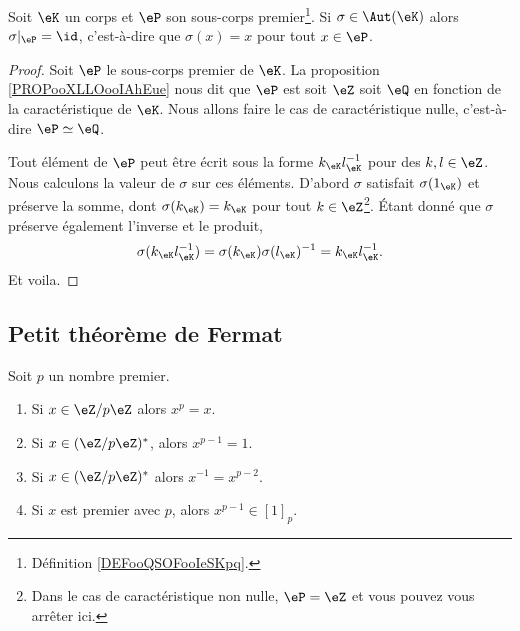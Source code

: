 \begin{proposition}     \label{PropqPPrgJ}
	Soit \( \eK\) un corps et \( \eP\) son sous-corps premier\footnote{Définition \ref{DEFooQSOFooIeSKpq}.}. Si \( \sigma\in\Aut(\eK)\) alors \( \sigma|_{\eP}=\id\), c'est-à-dire que \( \sigma(x)=x\) pour tout \( x\in \eP\).
\end{proposition}

\begin{proof}
	Soit \( \eP\) le sous-corps premier de \( \eK\). La proposition \ref{PROPooXLLOooIAhEue} nous dit que \( \eP\) est soit \( \eZ\) soit \( \eQ\) en fonction de la caractéristique de \( \eK\). Nous allons faire le cas de caractéristique nulle, c'est-à-dire \( \eP\simeq \eQ\).

	Tout élément de \( \eP\) peut être écrit sous la forme \( k_{\eK}l_{\eK}^{-1}\) pour des \( k,l\in \eZ\). Nous calculons la valeur de \( \sigma\) sur ces éléments. D'abord \( \sigma\) satisfait \( \sigma(1_{\eK})\) et préserve la somme, dont \( \sigma(k_{\eK})=k_{\eK}\) pour tout \( k\in \eZ\)\footnote{Dans le cas de caractéristique non nulle, \( \eP=\eZ\) et vous pouvez vous arrêter ici.}. Étant donné que \( \sigma\) préserve également l'inverse et le produit,
	\begin{equation}
		\sigma(k_{\eK}l_{\eK}^{-1})=\sigma(k_{\eK})\sigma(l_{\eK})^{-1}=k_{\eK}l_{\eK}^{-1}.
	\end{equation}
	Et voila.
\end{proof}

\subsection{Petit théorème de Fermat}

\begin{theorem}       \label{ThoOPQOiO}
	Soit \( p\) un nombre premier.
	\begin{enumerate}
		\item
		      Si \( x\in \eZ/p\eZ\) alors \( x^p=x\).
		\item
		      Si \( x\in(\eZ/p\eZ)^*\), alors \( x^{p-1}=1\).
		\item
		      Si \( x\in (\eZ/p\eZ)^*\) alors \( x^{-1}=x^{p-2}\).
		\item       \label{ITEMooRNIVooOIzqgc}
		      Si \( x\) est premier avec \( p\), alors \( x^{p-1}\in [1]_p\).
	\end{enumerate}
\end{theorem}

